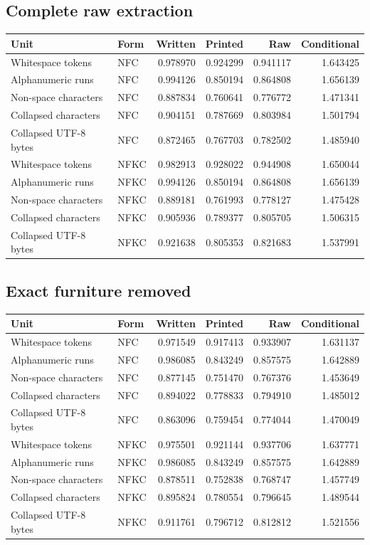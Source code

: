 \documentclass[a4paper,11pt]{article}
\begin{document}
{\small \subsection*{Complete raw extraction}\begin{tabular}{@{}llrrrr@{}}\toprule Unit & Form & Written & Printed & Raw & Conditional\\\midrule Whitespace tokens & NFC & 0.978970 & 0.924299 & 0.941117 & 1.643425 \\
Alphanumeric runs & NFC & 0.994126 & 0.850194 & 0.864808 & 1.656139 \\
Non-space characters & NFC & 0.887834 & 0.760641 & 0.776772 & 1.471341 \\
Collapsed characters & NFC & 0.904151 & 0.787669 & 0.803984 & 1.501794 \\
Collapsed UTF-8 bytes & NFC & 0.872465 & 0.767703 & 0.782502 & 1.485940 \\
Whitespace tokens & NFKC & 0.982913 & 0.928022 & 0.944908 & 1.650044 \\
Alphanumeric runs & NFKC & 0.994126 & 0.850194 & 0.864808 & 1.656139 \\
Non-space characters & NFKC & 0.889181 & 0.761993 & 0.778127 & 1.475428 \\
Collapsed characters & NFKC & 0.905936 & 0.789377 & 0.805705 & 1.506315 \\
Collapsed UTF-8 bytes & NFKC & 0.921638 & 0.805353 & 0.821683 & 1.537991 \\\bottomrule\end{tabular}
\subsection*{Exact furniture removed}\begin{tabular}{@{}llrrrr@{}}\toprule Unit & Form & Written & Printed & Raw & Conditional\\\midrule Whitespace tokens & NFC & 0.971549 & 0.917413 & 0.933907 & 1.631137 \\
Alphanumeric runs & NFC & 0.986085 & 0.843249 & 0.857575 & 1.642889 \\
Non-space characters & NFC & 0.877145 & 0.751470 & 0.767376 & 1.453649 \\
Collapsed characters & NFC & 0.894022 & 0.778833 & 0.794910 & 1.485012 \\
Collapsed UTF-8 bytes & NFC & 0.863096 & 0.759454 & 0.774044 & 1.470049 \\
Whitespace tokens & NFKC & 0.975501 & 0.921144 & 0.937706 & 1.637771 \\
Alphanumeric runs & NFKC & 0.986085 & 0.843249 & 0.857575 & 1.642889 \\
Non-space characters & NFKC & 0.878511 & 0.752838 & 0.768747 & 1.457749 \\
Collapsed characters & NFKC & 0.895824 & 0.780554 & 0.796645 & 1.489544 \\
Collapsed UTF-8 bytes & NFKC & 0.911761 & 0.796712 & 0.812812 & 1.521556 \\\bottomrule\end{tabular}
}
\end{document}
